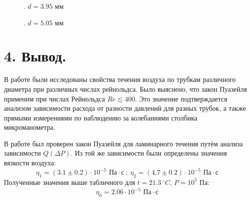 \documentclass[a4paper]{article}
\begin{document}
\begin{figure}
\caption{. $d = 3.95$ мм}
\end{figure}
\begin{figure}
\caption{. $d = 5.05$ мм}
\end{figure}
\section*{4. Вывод.}
В работе были исследованы свойства течения воздуха по трубкам различного диаметра при различных числах рейнольдса. Было выяснено, что закон Пуазейля применим при числах Рейнольдса $Re \lesssim 400$. Это значение подтверждается анализом зависимости расхода от разности давлений для разных трубок, а также прямыми измерениями по наблюдению за колебаниями столбика микроманометра.

\noindent
В работе был проверен закон Пуазейля для ламинарного течения путём анализа зависимости $Q(\Delta P)$. Из той же зависимости были определены значения вязкости воздуха:
\[\eta_1 =  (3.1 \pm 0.2) \cdot 10^{-5} \text{ Па} \cdot \text{с} \ ; \ \eta_2 = (4.7 \pm 0.2) \cdot 10^{-5} \text{ Па} \cdot \text{с}\]
Полученные значения выше табличного для $t = 21.3 \ ^{\circ}C$, $P = 10^{5}$ Па:
\[\eta_0 = 2.06 \cdot 10^{-5} \text{ Па} \cdot \text{с} \]
\end{document}
